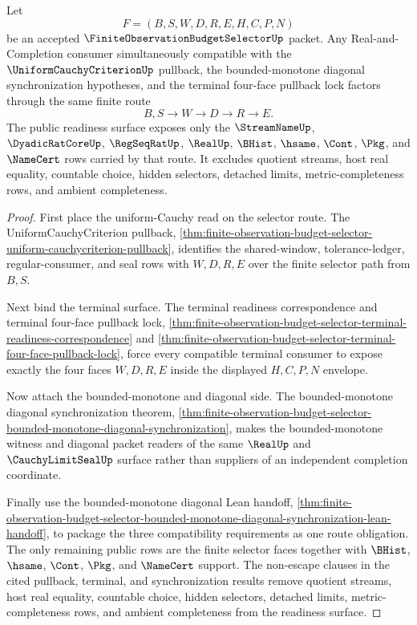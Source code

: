 \begin{theorem}
\label{thm:finite-observation-budget-selector-uniform-cauchy-real-readiness}
Let
$$
F=(B,S,W,D,R,E,H,C,P,N)
$$
be an accepted $\FiniteObservationBudgetSelectorUp$ packet. Any Real-and-Completion consumer simultaneously compatible with the $\UniformCauchyCriterionUp$ pullback, the bounded-monotone diagonal synchronization hypotheses, and the terminal four-face pullback lock factors through the same finite route
$$
B,S \to W \to D \to R \to E.
$$
The public readiness surface exposes only the $\StreamNameUp$, $\DyadicRatCoreUp$, $\RegSeqRatUp$, $\RealUp$, $\BHist$, $\hsame$, $\Cont$, $\Pkg$, and $\NameCert$ rows carried by that route. It excludes quotient streams, host real equality, countable choice, hidden selectors, detached limits, metric-completeness rows, and ambient completeness.
\end{theorem}
\begin{proof}
First place the uniform-Cauchy read on the selector route. The UniformCauchyCriterion pullback, \autoref{thm:finite-observation-budget-selector-uniform-cauchycriterion-pullback}, identifies the shared-window, tolerance-ledger, regular-consumer, and seal rows with $W,D,R,E$ over the finite selector path from $B,S$.

Next bind the terminal surface. The terminal readiness correspondence and terminal four-face pullback lock, \autoref{thm:finite-observation-budget-selector-terminal-readiness-correspondence} and \autoref{thm:finite-observation-budget-selector-terminal-four-face-pullback-lock}, force every compatible terminal consumer to expose exactly the four faces $W,D,R,E$ inside the displayed $H,C,P,N$ envelope.

Now attach the bounded-monotone and diagonal side. The bounded-monotone diagonal synchronization theorem, \autoref{thm:finite-observation-budget-selector-bounded-monotone-diagonal-synchronization}, makes the bounded-monotone witness and diagonal packet readers of the same $\RealUp$ and $\CauchyLimitSealUp$ surface rather than suppliers of an independent completion coordinate.

Finally use the bounded-monotone diagonal Lean handoff, \autoref{thm:finite-observation-budget-selector-bounded-monotone-diagonal-synchronization-lean-handoff}, to package the three compatibility requirements as one route obligation. The only remaining public rows are the finite selector faces together with $\BHist$, $\hsame$, $\Cont$, $\Pkg$, and $\NameCert$ support. The non-escape clauses in the cited pullback, terminal, and synchronization results remove quotient streams, host real equality, countable choice, hidden selectors, detached limits, metric-completeness rows, and ambient completeness from the readiness surface.
\end{proof}
